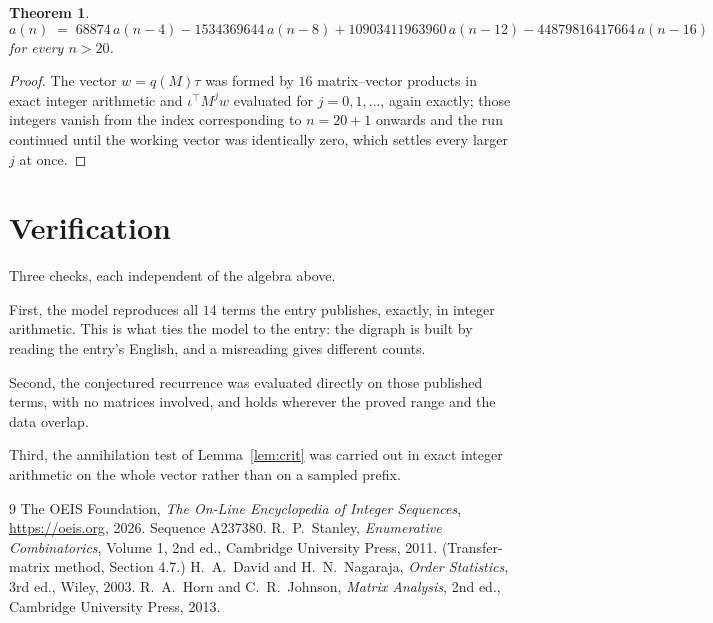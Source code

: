 \documentclass[11pt,a4paper]{article}
\theoremstyle{plain}
\newtheorem{theorem}{Theorem}
\theoremstyle{definition}
\begin{document}
\begin{theorem}
\[
a(n)\;=\;68874\,a(n-4) - 1534369644\,a(n-8) + 10903411963960\,a(n-12) - 44879816417664\,a(n-16)
\]
for every $n>20$.
\end{theorem}

\begin{proof}
The vector $w=q(M)\tau$ was formed by $16$ matrix--vector products in exact integer
arithmetic and $\iota^{\!\top}M^{j}w$ evaluated for $j=0,1,\dots$, again exactly; those
integers vanish from the index corresponding to $n=20+1$ onwards and the run continued
until the working vector was identically zero, which settles every larger $j$ at once.
\end{proof}

\section{Verification}

Three checks, each independent of the algebra above.

First, the model reproduces all $14$ terms the entry publishes, exactly, in integer
arithmetic. This is what ties the model to the entry: the digraph is built by reading the
entry's English, and a misreading gives different counts.

Second, the conjectured recurrence was evaluated directly on those published terms, with no
matrices involved, and holds wherever the proved range and the data overlap.

Third, the annihilation test of Lemma~\ref{lem:crit} was carried out in exact integer
arithmetic on the whole vector rather than on a sampled prefix.

\begin{thebibliography}{9}
 The OEIS Foundation, \emph{The On-Line Encyclopedia of Integer
Sequences}, \url{https://oeis.org}, 2026. Sequence A237380.
 R.~P.~Stanley, \emph{Enumerative Combinatorics}, Volume 1, 2nd ed.,
Cambridge University Press, 2011. (Transfer-matrix method, Section 4.7.)
 H.~A.~David and H.~N.~Nagaraja, \emph{Order Statistics}, 3rd ed., Wiley,
2003.
 R.~A.~Horn and C.~R.~Johnson, \emph{Matrix Analysis}, 2nd ed., Cambridge
University Press, 2013.
\end{thebibliography}
\end{document}
